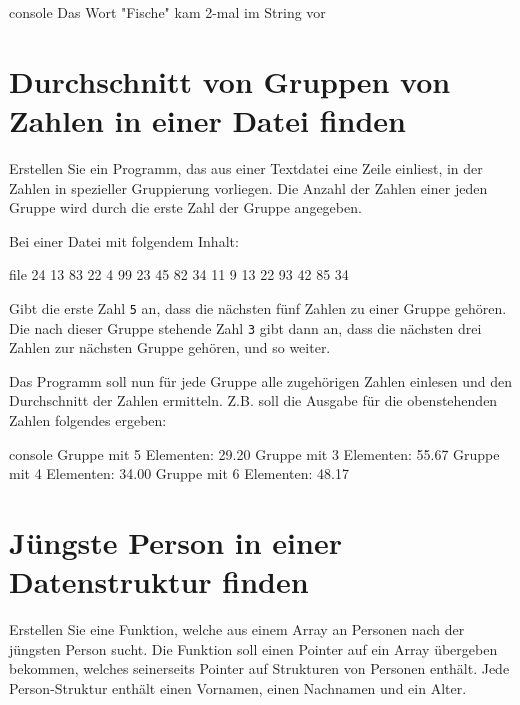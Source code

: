 \begin{mybox}[Bildschirmausgabe]{console}
Das Wort "Fische" kam 2-mal im String vor
\end{mybox}



\chapter{Durchschnitt von Gruppen von Zahlen in einer Datei finden}

\vspace{10pt}

Erstellen Sie ein Programm, das aus einer Textdatei eine Zeile einliest, in der
Zahlen in spezieller Gruppierung vorliegen. Die Anzahl der Zahlen einer jeden
Gruppe wird durch die erste Zahl der Gruppe angegeben.

Bei einer Datei mit folgendem Inhalt:

\begin{mybox}{file}
 24 13 83 22 4  99 23 45  82 34 11 9  13 22 93 42 85 34
\end{mybox}

Gibt die erste Zahl \texttt{5} an, dass die nächsten fünf Zahlen zu
einer Gruppe gehören. Die nach dieser Gruppe stehende Zahl \texttt{3}
gibt dann an, dass die nächsten drei Zahlen zur nächsten Gruppe gehören, und so
weiter.

Das Programm soll nun für jede Gruppe alle zugehörigen Zahlen einlesen und den
Durchschnitt der Zahlen ermitteln. Z.B. soll die Ausgabe für die obenstehenden
Zahlen folgendes ergeben:

\begin{mybox}[Bildschirmausgabe]{console}
Gruppe mit 5 Elementen: 29.20
Gruppe mit 3 Elementen: 55.67
Gruppe mit 4 Elementen: 34.00
Gruppe mit 6 Elementen: 48.17
\end{mybox}




\chapter{Jüngste Person in einer Datenstruktur finden}

\vspace{10pt}

Erstellen Sie eine Funktion, welche aus einem Array an Personen nach der
jüngsten Person sucht. Die Funktion soll einen Pointer auf ein Array übergeben
bekommen, welches seinerseits Pointer auf Strukturen von Personen enthält. Jede
Person-Struktur enthält einen Vornamen, einen Nachnamen und ein Alter.

